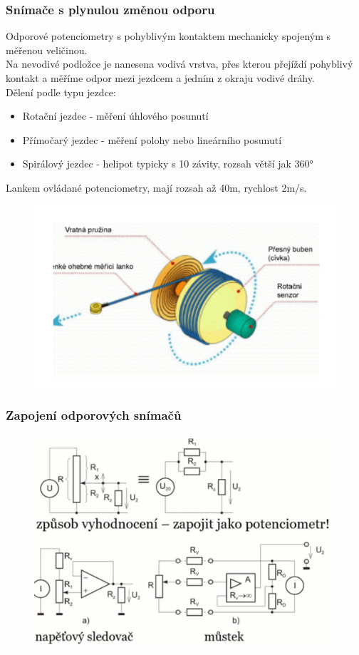 \subsubsection{Snímače s plynulou změnou odporu}
Odporové potenciometry s pohyblivým kontaktem mechanicky spojeným s měřenou veličinou.\\
Na nevodivé podložce je nanesena vodivá vrstva, přes kterou přejíždí pohyblivý kontakt a měříme odpor mezi jezdcem a jedním z okraju vodivé dráhy.\\
Dělení podle typu jezdce:
\begin{itemize}
    \item Rotační jezdec - měření úhlového posunutí
    \item Přímočarý jezdec - měření polohy nebo lineárního posunutí
    \item Spirálový jezdec - helipot typicky s 10 závity, rozsah větší jak 360°
\end{itemize}
Lankem ovládané potenciometry, mají rozsah až 40m, rychlost 2m/s.
\begin{figure}[h!]
    \centering
    \includegraphics[scale = 0.1]{img/Lanko.png}
\end{figure}

\subsubsection{Zapojení odporových snímačů}
\begin{figure}[h!]
    \centering
    \includegraphics[scale = 0.1]{img/ZapojeniOdp.png}
\end{figure}

